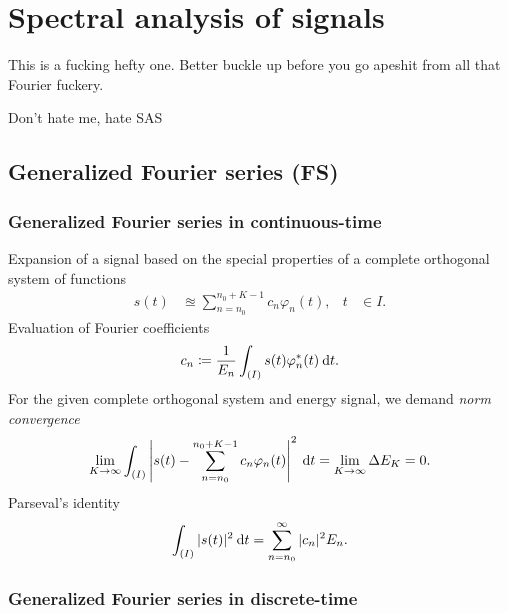 \documentclass[11pt,a4paper]{report}
\theoremstyle{remark}
\theoremstyle{definition}
\begin{document}
			
		
	\chapter{Spectral analysis of signals}
	\epigraph{
		This is a fucking hefty one. Better buckle up before you go apeshit from all that Fourier fuckery.
	}{Don't hate me, hate SAS}
			
		\section{Generalized Fourier series (FS)}
			
			\subsection{Generalized Fourier series in continuous-time}
				
				Expansion of a signal based on the special properties of a complete orthogonal system of functions
				\begin{align}
					\label{def:ctgfs}
					s(t) &\approxeq \sum_{n=n_0}^{n_0+K-1} c_n \varphi_n(t),
				&
					t &\in I.
				\end{align}
				Evaluation of Fourier coefficients
				\begin{align}
					\label{def:ctgfscoeffs}
					c_n \coloneqq \frac{1}{E_n} \int_{(I)} s(t) \varphi_n^*(t) \: {\mathrm d} t. 
				\end{align}
				For the given complete orthogonal system and energy signal, we demand \textit{norm convergence}
				\begin{align}
					\label{eq:ctnormconv}
					\lim\limits_{K \to \infty} \int_{(I)} \left| s(t) - \sum_{n=n_0}^{n_0+K-1} c_n \varphi_n(t) \right|^2 \: {\mathrm d} t = \lim\limits_{K \to \infty} \Delta E_K = 0.
				\end{align}
				Parseval's identity
				\begin{align}
					\label{ctpars}
					\int_{(I)} |s(t)|^2 \: {\mathrm d} t = \sum_{n=n_0}^{\infty} |c_n|^2 E_n.
				\end{align}
				
			\subsection{Generalized Fourier series in discrete-time}
				
\end{document}
